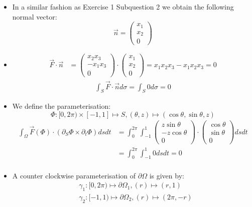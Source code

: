 \documentclass[11pt]{article}
\begin{document}
\begin{solution}     
    \begin{itemize}
    \item
    In a similar fashion as Exercise 1 Subquestion 2 we obtain the following normal vector:
		$$\vec{n} = \begin{pmatrix} x_1\\x_2\\0 \end{pmatrix}$$
    \item 
	\begin{align*}
	\vec F \cdot \vec n & = \begin{pmatrix}x_2x_3 \\ -x_1x_3\\0\end{pmatrix}\cdot \begin{pmatrix}x_1 \\ x_2\\0\end{pmatrix} = x_1x_2x_3 - x_1x_2x_3 = 0
	\end{align*}
	\begin{align*}
        \int_S \vec F \cdot \vec{n}d\sigma = \int_S 0 d\sigma = 0
     \end{align*}
    \item
    We define the parameterisation: 
	$$
	\Phi: [0,2\pi) \times [-1,1] \mapsto S, (\theta ,z) \mapsto (\cos\theta, \sin\theta ,z)
	$$
	\begin{align*}
        \int_\Omega \vec F(\Phi) \cdot ( \partial_S \Phi \times \partial_t \Phi ) dsdt &=\int_0^{2\pi} \int_{-1}^1 \begin{pmatrix}z\sin\theta\\ -z\cos\theta \\ 0\end{pmatrix} \cdot \begin{pmatrix}\cos\theta\\ \sin\theta \\ 0\end{pmatrix} dsdt \\
	    & = \int_0^{2\pi} \int_{-1}^1 0  dsdt  = 0\\
     \end{align*}
    \item 
    A counter clockwise parameterisation of $\partial \Omega$ is given by:
	\begin{align*}
	&\gamma_1: [0,2\pi) \mapsto \partial \Omega_1, (r) \mapsto (r, 1)\\
	&\gamma_2: [-1,1) \mapsto \partial \Omega_2, (r) \mapsto (2\pi, -r)\\

\end{align*}
\end{itemize}
\end{solution}
\end{document}
